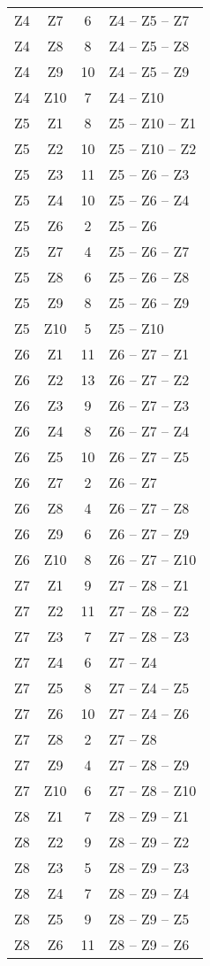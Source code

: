 \documentclass[a4paper,11pt]{article}
\begin{document}
\begin{longtable}{c c c p{7cm}}
Z4 & Z7 & 6 & Z4 -- Z5 -- Z7 \\
Z4 & Z8 & 8 & Z4 -- Z5 -- Z8 \\
Z4 & Z9 & 10 & Z4 -- Z5 -- Z9 \\
Z4 & Z10 & 7 & Z4 -- Z10 \\
Z5 & Z1 & 8 & Z5 -- Z10 -- Z1 \\
Z5 & Z2 & 10 & Z5 -- Z10 -- Z2 \\
Z5 & Z3 & 11 & Z5 -- Z6 -- Z3 \\
Z5 & Z4 & 10 & Z5 -- Z6 -- Z4 \\
Z5 & Z6 & 2 & Z5 -- Z6 \\
Z5 & Z7 & 4 & Z5 -- Z6 -- Z7 \\
Z5 & Z8 & 6 & Z5 -- Z6 -- Z8 \\
Z5 & Z9 & 8 & Z5 -- Z6 -- Z9 \\
Z5 & Z10 & 5 & Z5 -- Z10 \\
Z6 & Z1 & 11 & Z6 -- Z7 -- Z1 \\
Z6 & Z2 & 13 & Z6 -- Z7 -- Z2 \\
Z6 & Z3 & 9 & Z6 -- Z7 -- Z3 \\
Z6 & Z4 & 8 & Z6 -- Z7 -- Z4 \\
Z6 & Z5 & 10 & Z6 -- Z7 -- Z5 \\
Z6 & Z7 & 2 & Z6 -- Z7 \\
Z6 & Z8 & 4 & Z6 -- Z7 -- Z8 \\
Z6 & Z9 & 6 & Z6 -- Z7 -- Z9 \\
Z6 & Z10 & 8 & Z6 -- Z7 -- Z10 \\
Z7 & Z1 & 9 & Z7 -- Z8 -- Z1 \\
Z7 & Z2 & 11 & Z7 -- Z8 -- Z2 \\
Z7 & Z3 & 7 & Z7 -- Z8 -- Z3 \\
Z7 & Z4 & 6 & Z7 -- Z4 \\
Z7 & Z5 & 8 & Z7 -- Z4 -- Z5 \\
Z7 & Z6 & 10 & Z7 -- Z4 -- Z6 \\
Z7 & Z8 & 2 & Z7 -- Z8 \\
Z7 & Z9 & 4 & Z7 -- Z8 -- Z9 \\
Z7 & Z10 & 6 & Z7 -- Z8 -- Z10 \\
Z8 & Z1 & 7 & Z8 -- Z9 -- Z1 \\
Z8 & Z2 & 9 & Z8 -- Z9 -- Z2 \\
Z8 & Z3 & 5 & Z8 -- Z9 -- Z3 \\
Z8 & Z4 & 7 & Z8 -- Z9 -- Z4 \\
Z8 & Z5 & 9 & Z8 -- Z9 -- Z5 \\
Z8 & Z6 & 11 & Z8 -- Z9 -- Z6 \\

\end{longtable}
\end{document}

